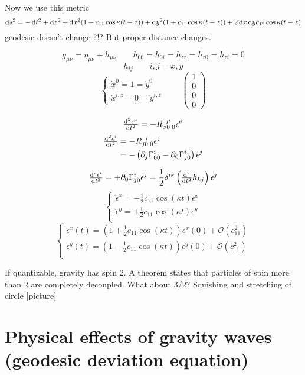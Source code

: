 Now we use this metric
\[ \operatorname{d \!}{s}^2 =  - \operatorname{d \!}{t}^2 + \operatorname{d \!}{z}^2 + \operatorname{d \!}{x}^2(1+c_{11}\cos\kappa(t-z)) + \operatorname{d \!}{y}^2(1+c_{11}\cos\kappa(t-z)) + 2 \operatorname{d \!}{x} \operatorname{d \!}{y} c_{12}\cos\kappa(t-z)\]
geodesic doesn't change ?!? But proper distance changes.

\[ g_{\mu\nu} = \eta_{\mu\nu} + h_{\mu\nu} \qquad h_{00}=h_{0i} = h_{zz} = h_{z0} = h_{zi} = 0\]
\[ h_{ij} \qquad i,j = x,y \]
\[ \begin{cases}
\dot{x}^0 = 1 =\dot{y}^0 \\
\dot{x}^{i,z} = 0 = \dot{y}^{i,z}
\end{cases}\qquad \begin{pmatrix}
1\\0\\0\\0
\end{pmatrix} \]

\[ \od[2]{\epsilon^\mu}{t} = -R_{\sigma0\;0}^{\;\;\mu}\epsilon^\sigma \]
\begin{align*}
\od[2]{\epsilon^i}{t}&= -R_{j0\;0}^{\;\;i}\epsilon^j \\
&= - \left(\partial_j\Gamma_{00}^i - \partial_0\Gamma^i_{j0}\right)\epsilon^j
\end{align*}

\[ \od[2]{\epsilon^i}{t} = + \partial_0\Gamma^i_{j0}\epsilon^j = \frac{1}{2}\delta^{ik}\left(\od[2]{}{t}h_{kj}\right)\epsilon^j \]
\[ \begin{cases}
\ddot{\epsilon}^x = - \frac{1}{2}c_{11} \cos(\kappa t)\epsilon^x \\
\ddot{\epsilon}^y = + \frac{1}{2}c_{11} \cos(\kappa t)\epsilon^y \\
\end{cases} \]
\[ \begin{cases}
\epsilon^x(t) = \left(1+ \frac{1}{2}c_{11}\cos(\kappa t)\right)\epsilon^x(0) + \mathcal{O}(c_11^2) \\
\epsilon^y(t) = \left(1- \frac{1}{2}c_{11}\cos(\kappa t)\right)\epsilon^y(0) + \mathcal{O}(c_11^2) \\
\end{cases} \]

If quantizable, gravity has spin 2. A theorem states that particles of spin more than 2 are completely decoupled. What about 3/2?
Squishing and stretching of circle [picture]
\section{Physical effects of gravity waves (geodesic deviation equation)}

